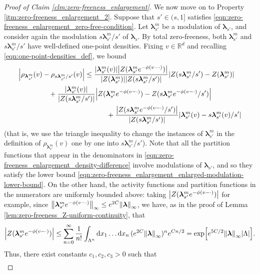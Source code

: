 \documentclass[11pt]{article}
\newcommand{\R}{\mathbb R}
\newcommand{\bl}{\bm{\lambda}}
\newcommand{\lsconst}{C}
\numberwithin{equation}{section}
\theoremstyle{plain}
\theoremstyle{definition}
\theoremstyle{remark}
\begin{document}
\begin{proof}[Proof of Claim \ref{clm:zero-freeness_enlargement}]
We now move on to Property \ref{itm:zero-freeness_enlargement_2}.
Suppose that $s'\in(s,1]$ satisfies \eqref{eqn:zero-freeness_enlargement_zero-free-condition}.
Let $\bl_{s'}^{m}$ be a modulation of $\bl_{s'}$, and consider again the modulation $s\bl_{s'}^{m}/s'$ of $\bl_{s}$.
By total zero-freeness, both $\bl_{s'}^{m}$ and $s\bl_{s'}^{m}/s'$ have well-defined one-point densities.
Fixing $v\in\R^{d}$ and recalling \eqref{eqn:one-point-densities_def}, we bound
\begin{equation}
\label{eqn:zero-freeness_enlargement_density-difference}
\begin{multlined}
\abs{\rho_{\bl_{s'}^{m}}(v)-\rho_{s\bl_{s'}^{m}/s'}(v)}
\le\frac{\abs{\bl_{s'}^{m}(v)}\abs{Z(\bl_{s'}^{m}e^{-\phi(v-\cdot)})}}{\abs{Z(\bl_{s'}^{m})}\abs{Z(s\bl_{s'}^{m}/s')}}\abs{Z(s\bl_{s'}^{m}/s')-Z(\bl_{s'}^{m})}
\\
+\frac{\abs{\bl_{s'}^{m}(v)}}{\abs{Z(s\bl_{s'}^{m}/s')}}\abs{Z(\bl_{s'}^{m}e^{-\phi(v-\cdot)})-Z(s\bl_{s'}^{m}e^{-\phi(v-\cdot)}/s')}
\\
+\frac{\abs{Z(s\bl_{s'}^{m}e^{-\phi(v-\cdot)}/s')}}{\abs{Z(s\bl_{s'}^{m}/s')}}\abs{\bl_{s'}^{m}(v)-s\bl_{s'}^{m}(v)/s'}
\end{multlined}
\end{equation}
(that is, we use the triangle inequality to change the instances of $\bl_{s'}^{m}$ in the definition of $\rho_{\bl_{s'}^{m}}(v)$ one by one into $s\bl_{s'}^{m}/s'$).
Note that all the partition functions that appear in the denominators in \eqref{eqn:zero-freeness_enlargement_density-difference} involve modulations of $\bl_{s'}$, and so they satisfy the lower bound \eqref{eqn:zero-freeness_enlargement_enlarged-modulation-lower-bound}.
On the other hand, the activity functions and partition functions in the numerators are uniformly bounded above: taking $\abs{Z(\bl_{s'}^{m}e^{-\phi(v-\cdot)})}$ for example, since $\norm{\bl_{s'}^{m}e^{-\phi(v-\cdot)}}_{\infty}\le e^{2\lsconst}\norm{\bl}_{\infty}$, we have, as in the proof of Lemma \ref{lem:zero-freeness_Z-uniform-continuity}, that
\begin{equation}
\abs{Z(\bl_{s'}^{m}e^{-\phi(v-\cdot)})}
\le\sum_{n=0}^{\infty}\frac{1}{n!}\int_{\Lambda^{n}}\dd{x}_{1}\dots\dd{x}_{n}(e^{2\lsconst}\norm{\bl}_{\infty})^{n}e^{\lsconst n/2}
=\exp[e^{5\lsconst/2}\norm{\bl}_{\infty}\abs{\Lambda}].
\end{equation}
Thus, there exist constants $c_{1},c_{2},c_{3}>0$ such that 
\begin{equation}
\begin{multlined}

\end{multlined}
\end{equation}
\end{proof}
\end{document}
